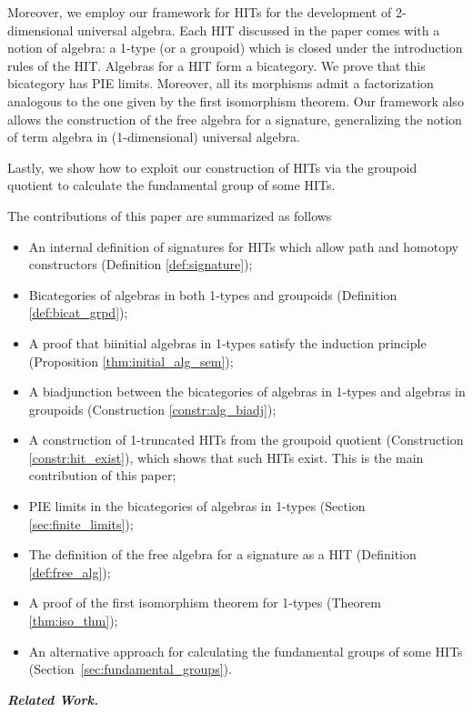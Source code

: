 Moreover, we employ our framework for HITs for the development of
2-dimensional universal algebra. Each HIT discussed in the paper comes
with a notion of algebra: a 1-type (or a groupoid) which is closed
under the introduction rules of the HIT.  Algebras for a HIT form a
bicategory. We prove that this bicategory has PIE limits. Moreover,
all its morphisms admit a factorization analogous to the one given by the
first isomorphism theorem. Our framework also allows the construction
of the free algebra for a signature, generalizing the notion of term
algebra in (1-dimensional) universal algebra.

Lastly, we show how to exploit our construction of HITs via the
groupoid quotient to calculate the fundamental group of some HITs.

The contributions of this paper are summarized as follows
\begin{itemize}
	\item An internal definition of signatures for HITs which allow path and homotopy constructors (Definition \ref{def:signature});
	\item Bicategories of algebras in both 1-types and groupoids (Definition \ref{def:bicat_grpd});
	\item A proof that biinitial algebras in 1-types satisfy the induction principle (Proposition \ref{thm:initial_alg_sem});
	\item A biadjunction between the bicategories of algebras in 1-types and algebras in groupoids (Construction \ref{constr:alg_biadj});
	\item A construction of 1-truncated HITs from the groupoid quotient (Construction \ref{constr:hit_exist}),
	which shows that such HITs exist.
	This is the main contribution of this paper;
        \item PIE limits in the bicategories of algebras in 1-types (Section \ref{sec:finite_limits});
        \item The definition of the free algebra for a signature as a HIT (Definition \ref{def:free_alg});
        \item A proof of the first isomorphism theorem for 1-types (Theorem \ref{thm:iso_thm});
        \item An alternative approach for calculating the fundamental groups of some HITs (Section~\ref{sec:fundamental_groups}).
\end{itemize}
\emph{\textbf{Related Work.}}

